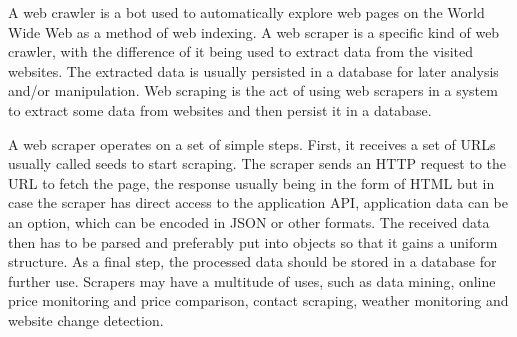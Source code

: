 \documentclass[12pt,a4paper,twoside]{report}
\begin{document}
A web crawler is a bot used to automatically explore web pages on the World Wide Web as a method of web indexing. A web scraper is a specific kind of web crawler, with the difference of it being used to extract data from the visited websites. The extracted data is usually persisted in a database for later analysis and/or manipulation. Web scraping is the act of using web scrapers in a system to extract some data from websites and then persist it in a database.

A web scraper operates on a set of simple steps. First, it receives a set of URLs usually called seeds to start scraping. The scraper sends an HTTP request to the URL to fetch the page, the response usually being in the form of HTML but in case the scraper has direct access to the application API, application data can be an option, which can be encoded in JSON or other formats. The received data then has to be parsed and preferably put into objects so that it gains a uniform structure. As a final step, the processed data should be stored in a database for further use. Scrapers may have a multitude of uses, such as data mining, online price monitoring and price comparison, contact scraping, weather monitoring and website change detection.
\end{document}
